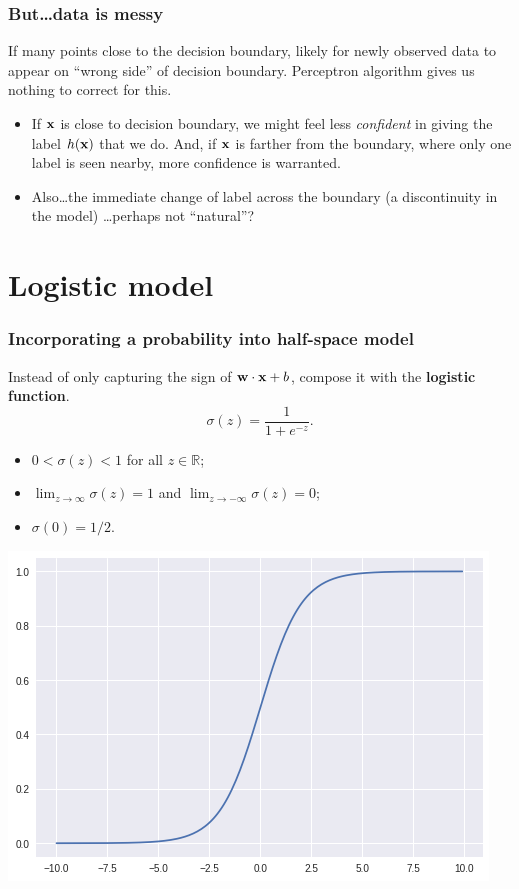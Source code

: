 \documentclass{beamer}
\theoremstyle{example}
\begin{document}
\begin{frame}
\frametitle{But\ldots data is messy}
If many points close to the decision boundary, likely for newly observed data to appear on ``wrong side'' of decision boundary. Perceptron algorithm gives us nothing to correct for this.

\pause
\begin{itemize}
    \item If ${\bf x}$ is close to decision boundary, we might feel less \textit{confident} in giving the label $h({\bf x})$ that we do. And, if ${\bf x}$ is farther from the boundary, where only one label is seen nearby, more confidence is warranted.
\pause
    \item Also\ldots the immediate change of label across the boundary (a discontinuity in the model) \ldots perhaps not ``natural''?
\end{itemize}
\end{frame}

\section{Logistic model}

\begin{frame}
\frametitle{Incorporating a probability into half-space model}
Instead of only capturing the sign of ${\bf w}\cdot{\bf x} + b$, compose it with the \textbf{logistic function}.    
    \[\sigma(z) = \frac{1}{1+e^{-z}}.\]

\pause
\begin{itemize}
    \item $0 < \sigma(z) < 1$ for all $z\in\mathbb R$;
    \pause
    \item $\lim_{z\to\infty}\sigma(z) = 1$ and $\lim_{z\to-\infty}\sigma(z) = 0$;
    \item $\sigma(0) = 1/2$.
\end{itemize}
\pause 

\centering
\includegraphics[height=0.3\textheight]{../../Images/logistic_function_graph.png}

\end{frame}
\end{document}
